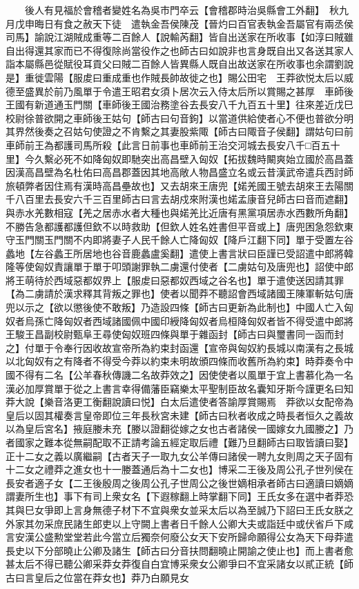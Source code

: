 　　後人有見福於會稽者變姓名為吳市門卒云【會稽郡時治吳縣會工外翻】　秋九月戊申晦日有食之赦天下徒　遣執金吾侯陳茂【晉灼曰百官表執金吾屬官有兩丞侯司馬】諭說江湖賊成重等二百餘人【說輸芮翻】皆自出送家在所收事【如淳曰賊雖自出得還其家而已不得復除尚當役作之也師古曰如說非也言身既自出又各送其家人詣本屬縣邑從賦役耳貢父曰賊二百餘人皆異縣人既自出故送家在所收事也余謂劉說是】重徙雲陽【服䖍曰重成重也作賊長帥故徙之也】賜公田宅　王莽欲悦太后以威德至盛異於前乃風單于令遣王昭君女須卜居次云入侍太后所以賞賜之甚厚　車師後王國有新道通玉門關【車師後王國治務塗谷去長安八千九百五十里】往來差近戊巳校尉徐普欲開之車師後王姑句【師古曰句音鉤】以當道供給使者心不便也普欲分明其界然後奏之召姑句使證之不肯繫之其妻股紫陬【師古曰陬音子侯翻】謂姑句曰前車師前王為都護司馬所殺【此言日前事也車師前王治交河城去長安八千□百五十里】今久繫必死不如降匈奴即馳突出高昌壁入匈奴【拓拔魏時闞爽始立國於高昌蓋因漢高昌壁為名杜佑曰高昌郡蓋因其地高敞人物昌盛立名或云昔漢武帝遣兵西討師旅頓弊者因住焉有漢時高昌壘故也】又去胡來王唐兜【婼羌國王號去胡來王去陽關千八百里去長安六千三百里師古曰言去胡戍來附漢也婼孟康音兒師古曰音而遮翻】與赤水羌數相寇【羌之居赤水者大種也與婼羌比近唐有黑黨項居赤水西數所角翻】不勝告急都護都護但欽不以時救助【但欽人姓名姓書但平音或上】唐兜困急怨欽東守玉門關玉門關不内即將妻子人民千餘人亡降匈奴【降戶江翻下同】單于受置左谷蠡地【左谷蠡王所居地也谷音鹿蠡盧奚翻】遣使上書言狀曰臣謹已受詔遣中郎將韓隆等使匈奴責讓單于單于叩頭謝罪執二虜還付使者【二虜姑句及唐兜也】詔使中郎將王萌待於西域惡都奴界上【服䖍曰惡都奴西域之谷名也】單于遣使送因請其罪【為二虜請於漢求釋其背叛之罪也】使者以聞莽不聽詔會西域諸國王陳軍斬姑句唐兜以示之【欲以懲後使不敢叛】乃造設四條【師古曰更新為此制也】中國人亡入匈奴者烏孫亡降匈奴者西域諸國佩中國印綬降匈奴者烏桓降匈奴者皆不得受遣中郎將王駿王昌副校尉甄阜王尋使匈奴班四條與單于雜函封【師古曰與璽書同一函而封之】付單于令奉行因收故宣帝所為約束封函還【宣帝與匈奴約長城以南漢有之長城以北匈奴有之有降者不得受今莽以約束未明故頒四條而收舊所為約束】時莽奏令中國不得有二名【公羊春秋傳譏二名故莽效之】因使使者以風單于宜上書慕化為一名漢必加厚賞單于從之上書言幸得備藩臣竊樂太平聖制臣故名囊知牙斯今謹更名曰知莽大說【樂音洛更工衡翻說讀曰悦】白太后遣使者答諭厚賞賜焉　莽欲以女配帝為皇后以固其權奏言皇帝即位三年長秋宮未建【師古曰秋者收成之時長者恒久之義故以為皇后宮名】掖庭媵未充【媵以證翻從嫁之女也古者諸侯一國嫁女九國媵之】乃者國家之難本從無嗣配取不正請考論五經定取后禮【難乃旦翻師古曰取皆讀曰娶】正十二女之義以廣繼嗣【古者天子一取九女公羊傳曰諸侯一聘九女則周之天子固有十二女之禮莽之進女也十一媵蓋通后為十二女也】博采二王後及周公孔子世列侯在長安者適子女【二王後殷周之後周公孔子世周公之後世嫡相承者師古曰適讀曰嫡嫡謂妻所生也】事下有司上衆女名【下遐稼翻上時掌翻下同】王氏女多在選中者莽恐其與巳女爭即上言身無德子材下不宜與衆女並采太后以為至誠乃下詔曰王氏女朕之外家其勿采庶民諸生郎吏以上守闕上書者日千餘人公卿大夫或詣廷中或伏省戶下咸言安漢公盛勲堂堂若此今當立后獨奈何廢公女天下安所歸命願得公女為天下母莽遣長史以下分部曉止公卿及諸生【師古曰分音扶問翻曉止開諭之使止也】而上書者愈甚太后不得已聽公卿采莽女莽復自白宜博采衆女公卿爭曰不宜采諸女以貳正統【師古曰言皇后之位當在莽女也】莽乃白願見女

